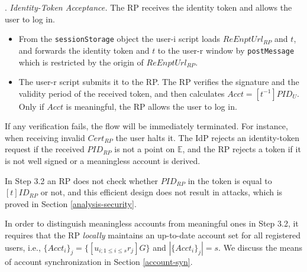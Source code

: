 . {\em Identity-Token Acceptance.}
The RP receives the identity token and allows the user to log in.
\begin{itemize}
\setlength{\topsep}{0pt}
\setlength{\partopsep}{0pt}
\setlength{\itemsep}{0pt}
\setlength{\parsep}{0pt}
\setlength{\parskip}{0pt}
\item [3.1]
From the \verb+sessionStorage+ object
the user-i script loads $ReEnptUrl_{RP}$ and $t$, 
    and forwards the identity token and $t$ to the user-r window by \verb+postMessage+ which is restricted by the origin of $ReEnptUrl_{RP}$.
\item[3.2] The user-r script submits it to the RP.
The RP verifies the signature and the validity period of the received token, 
and then calculates $Acct = [t^{-1}]{PID_U}$.
Only if $Acct$ is meaningful, the RP allows the user to log in.

\end{itemize}

If any verification fails, the flow will be immediately terminated.
For instance, when receiving invalid $Cert_{RP}$ the user halts it.
The IdP rejects an identity-token request if the received $PID_{RP}$ is not a point on $\mathbb{E}$, and the RP rejects a token if it is not well signed or a meaningless account is derived.

In Step 3.2 an RP does not check whether $PID_{RP}$ in the token is equal to $[t]ID_{RP}$ or not,
    and this efficient design does not result in attacks, which is proved in Section \ref{analysis-security}.

In order to distinguish meaningless accounts from meaningful ones in Step 3.2,
it requires that the RP \emph{locally} maintains an up-to-date account set for all registered users,
i.e., 
$\{Acct_i\}_j=\{[u_{i; 1 \leq i \leq s} r_j]G\}$ and $|\{Acct_i\}_j|=s$.
We discuss the means of account synchronization in Section \ref{account-syn}.


%

